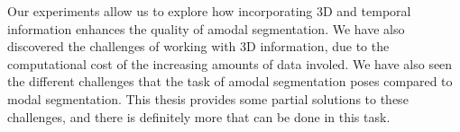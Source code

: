 Our experiments allow us to explore how incorporating 3D and temporal information enhances the quality of amodal segmentation. We have also discovered the challenges of working with 3D information, due to the computational cost of the increasing amounts of data involed. We have also seen the different challenges that the task of amodal segmentation poses compared to modal segmentation. This thesis provides some partial solutions to these challenges, and there is definitely more that can be done in this task. 